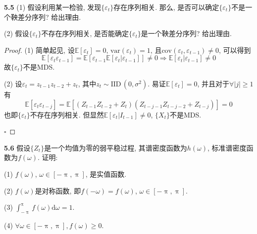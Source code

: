 \documentclass[cn,12pt,math=mtpro2,citestyle=gb7714-2015,bibstyle=gb7714-2015,twocol,mode=simple]{elegantbook}
\newcommand{\E}{\mathbb{E}}
\newcommand{\var}{\text{var}}
\begin{document}
\textbf{5.5} (1) 假设利用某一检验, 发现$\{\varepsilon_t\}$存在序列相关. 那么, 是否可以确定$\{\varepsilon_t\}$不是一个鞅差分序列? 给出理由.

(2) 假设$\{\varepsilon_t\}$不存在序列相关, 是否能确定$\{\varepsilon_t\}$是一个鞅差分序列? 给出理由.

\begin{proof}
  (1) 简单起见, 设$\E[\varepsilon_t]=0$, $\var(\varepsilon_t)=1$, 且$\text{cov}(\varepsilon_t,\varepsilon_{t-1})\neq 0$, 可以得到
  $$\E[\varepsilon_t\varepsilon_{t-1}]=\E[\varepsilon_{t-1}\E[\varepsilon_t|\varepsilon_{t-1}]]\neq 0 \Rightarrow \E[\varepsilon_t|\varepsilon_{t-1}]\neq 0$$
  故$\{\varepsilon_t\}$不是MDS.

  (2) 设$\varepsilon_t=z_{t-1}z_{t-2}+z_t$, 其中$z_t\sim \text{IID}\,(0,\sigma^2)$. 易证$\E[\varepsilon_t]=0$, 并且对于$\forall |j|\geq 1$有
  $$\E[\varepsilon_t\varepsilon_{t-j}]=\E[(Z_{t-1}Z_{t-2}+Z_t)(Z_{t-j-1}Z_{t-j-2}+Z_{t-j})]=0$$
  也即$\{\varepsilon_t\}$不存在序列相关. 但显然$\E[\varepsilon_t|I_{t-1}]\neq0$, $\{X_t\}$不是MDS.

  $\square$
\end{proof}

\textbf{5.6} 假设$\{Z_t\}$是一个均值为零的弱平稳过程, 其谱密度函数为$h(\omega)$, 标准谱密度函数为$f(\omega)$. 证明:

(1) $f(\omega)$, $\omega\in[-\uppi,\uppi]$, 是实值函数.

(2) $f(\omega)$是对称函数, 即$f(-\omega)=f(\omega)$, $\omega\in[-\uppi,\uppi]$.

(3) $\displaystyle\int_{-\uppi}^{\uppi}f(\omega)\text{d}\omega=1$.

(4) $\forall \omega \in [-\uppi,\uppi], f(\omega)\geq0$.
\end{document}

